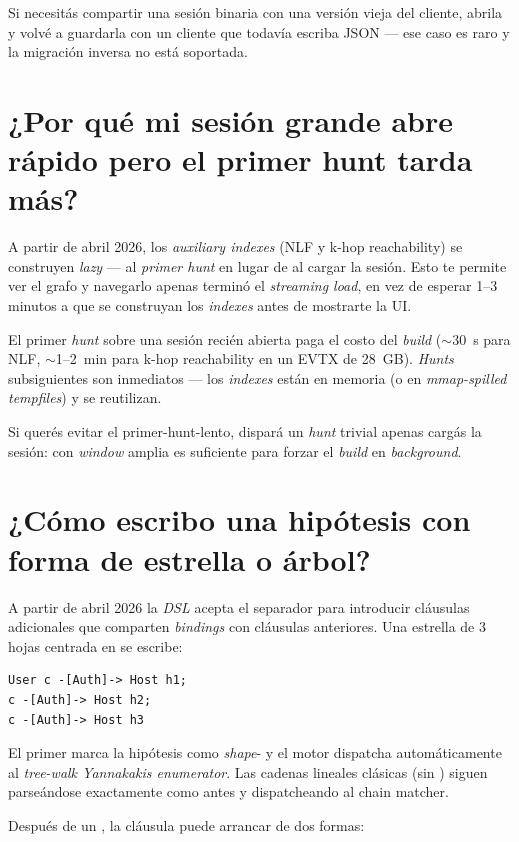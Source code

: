 Si necesitás compartir una sesión binaria con una versión vieja
del cliente, abrila y volvé a guardarla con un cliente que todavía
escriba JSON --- ese caso es raro y la migración inversa no
está soportada.

\section{¿Por qué mi sesión grande abre rápido pero el primer hunt tarda más?}

A partir de abril 2026, los \emph{auxiliary indexes} (NLF y k-hop
reachability) se construyen \emph{lazy} --- al \emph{primer hunt}
en lugar de al cargar la sesión. Esto te permite ver el grafo y
navegarlo apenas terminó el \emph{streaming load}, en vez de
esperar 1--3 minutos a que se construyan los \emph{indexes} antes
de mostrarte la UI.

El primer \emph{hunt} sobre una sesión recién abierta paga el
costo del \emph{build} ($\sim$30~s para NLF, $\sim$1--2~min para
k-hop reachability en un EVTX de 28~GB). \emph{Hunts} subsiguientes
son inmediatos --- los \emph{indexes} están en memoria
(o en \emph{mmap-spilled tempfiles}) y se reutilizan.

Si querés evitar el primer-hunt-lento, dispará un \emph{hunt}
trivial apenas cargás la sesión:  con
\emph{window} amplia es suficiente para forzar el \emph{build} en
\emph{background}.

\section{¿Cómo escribo una hipótesis con forma de estrella o árbol?}

A partir de abril 2026 la \emph{DSL} acepta el separador \code{;} para
introducir cláusulas adicionales que comparten \emph{bindings} con
cláusulas anteriores. Una estrella de 3 hojas centrada en 
se escribe:

\begin{verbatim}
User c -[Auth]-> Host h1;
c -[Auth]-> Host h2;
c -[Auth]-> Host h3
\end{verbatim}

El primer \code{;} marca la hipótesis como \emph{shape}- y
el motor dispatcha automáticamente al \emph{tree-walk Yannakakis
enumerator}. Las cadenas lineales clásicas (sin \code{;}) siguen
parseándose exactamente como antes y dispatcheando al chain
matcher.

Después de un \code{;}, la cláusula puede arrancar de dos formas:

